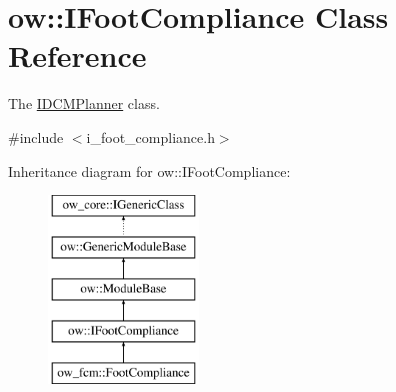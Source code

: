 \hypertarget{classow_1_1IFootCompliance}{}\section{ow\+:\+:I\+Foot\+Compliance Class Reference}
\label{classow_1_1IFootCompliance}


The \hyperlink{classow_1_1IDCMPlanner}{I\+D\+C\+M\+Planner} class.  




{\ttfamily \#include $<$i\+\_\+foot\+\_\+compliance.\+h$>$}

Inheritance diagram for ow\+:\+:I\+Foot\+Compliance\+:\begin{figure}[H]
\begin{center}
\leavevmode
\includegraphics[height=5.000000cm]{d7/dfc/classow_1_1IFootCompliance}
\end{center}
\end{figure}
